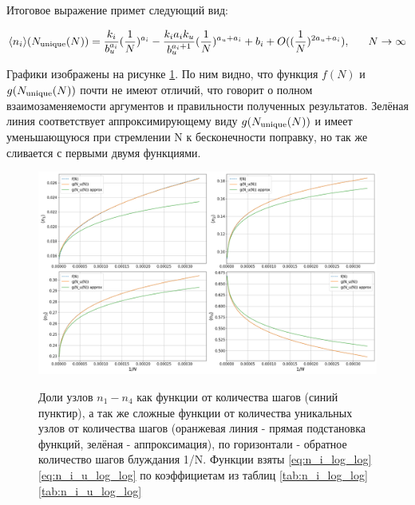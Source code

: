 Итоговое выражение примет следующий вид:

\begin{large}
\begin{equation}
\langle n_i \rangle (N_{\textup{unique}}(N)) = \frac{k_i}{b_u^{a_i}} (\frac{1}{N})^{a_i} - \frac{k_i a_i k_u}{b_u^{a_i+1}} (\frac{1}{N})^{a_u+a_i} + b_i + O((\frac{1}{N})^{2 a_u +a_i}),\ \ \ \ \ N \to \infty
\end{equation}
\label{g_n_expect}
\end{large}

Графики изображены на рисунке \ref{fig:ni_fn_vs_gNun}. По ним видно, что функция $f(N)$ и $g(N_{\textup{unique}}(N))$ почти не имеют отличий, что говорит о полном взаимозаменяемости аргументов и правильности полученных результатов. Зелёная линия соответствует аппроксимирующему виду $g(N_{\textup{unique}}(N))$ и имеет уменьшающуюся при стремлении N к бесконечности поправку, но так же сливается с первыми двумя функциями.

\begin{figure}
\centering
\includegraphics[width=\textwidth]{Sections/Images_2/n_i_fN_vs_gNun.png}
\label{fig:ni_fn_vs_gNun}
\caption{Доли узлов $n_1-n_4$ как функции от количества шагов (синий пунктир), а так же сложные функции от количества уникальных узлов от количества шагов (оранжевая линия - прямая подстановка функций, зелёная - аппроксимация), по горизонтали - обратное количество шагов блуждания 1/N. Функции взяты \ref{eq:n_i_log_log} \ref{eq:n_i_u_log_log} по коэффициетам из таблиц \ref{tab:n_i_log_log} \ref{tab:n_i_u_log_log}}
\end{figure}
